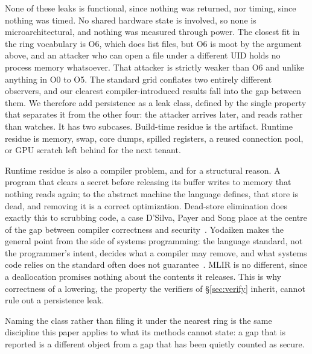 None of these leaks is functional, since nothing was returned, nor
timing, since nothing was timed. No shared hardware state is involved,
so none is microarchitectural, and nothing was measured through power.
The closest fit in the ring vocabulary is O6, which does list files,
but O6 is moot by the argument above, and an attacker who can open a
file under a different UID holds no process memory whatsoever. That
attacker is strictly weaker than O6 and unlike anything in O0 to O5.
The standard grid conflates two entirely different observers, and our
clearest compiler-introduced results fall into the gap between them. We
therefore add persistence as a leak class, defined by the single
property that separates it from the other four: the attacker arrives
later, and reads rather than watches. It has two subcases. Build-time
residue is the artifact. Runtime residue is memory, swap, core dumps,
spilled registers, a reused connection pool, or GPU scratch left behind
for the next tenant.
 
Runtime residue is also a compiler problem, and for a structural
reason. A program that clears a secret before releasing its buffer
writes to memory that nothing reads again; to the abstract machine the
language defines, that store is dead, and removing it is a correct
optimization. Dead-store elimination does exactly this to scrubbing
code, a case D'Silva, Payer and Song place at the centre of the gap
between compiler correctness and security~\cite{dsilva2015gap}.
Yodaiken makes the general point from the side of systems programming:
the language standard, not the programmer's intent, decides what a
compiler may remove, and what systems code relies on the standard often
does not guarantee~\cite{yodaiken2021iso}. MLIR is no different, since
a deallocation promises nothing about the contents it releases. This is
why correctness of a lowering, the property the verifiers of
\S\ref{sec:verify} inherit, cannot rule out a persistence leak.
 
Naming the class rather than filing it under the nearest ring is the
same discipline this paper applies to what its methods cannot state: a
gap that is reported is a different object from a gap that has been
quietly counted as secure.
